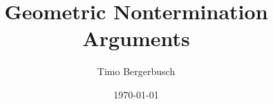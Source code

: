 \documentclass{beamer}
\title{Geometric Nontermination Arguments}
\author{Timo Bergerbusch}
\date{\today}
\begin{document}
\maketitle
\frame{\tableofcontents}





\end{document}
